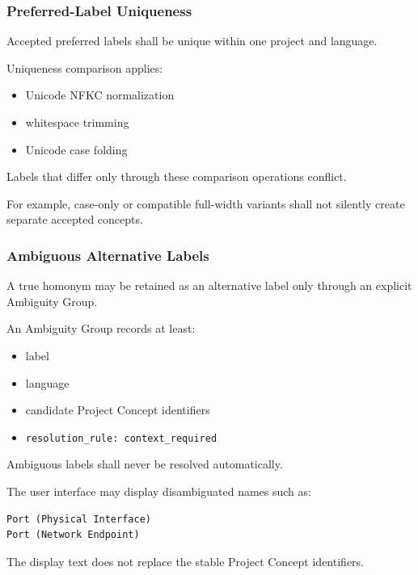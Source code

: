 \hypertarget{preferred-label-uniqueness}{%
\subsubsection{Preferred-Label Uniqueness}\label{preferred-label-uniqueness}}

Accepted preferred labels shall be unique within one project and language.

Uniqueness comparison applies:

\begin{itemize}
\tightlist
\item
  Unicode NFKC normalization
\item
  whitespace trimming
\item
  Unicode case folding
\end{itemize}

Labels that differ only through these comparison operations conflict.

For example, case-only or compatible full-width variants shall not silently create separate accepted concepts.

\hypertarget{ambiguous-alternative-labels}{%
\subsubsection{Ambiguous Alternative Labels}\label{ambiguous-alternative-labels}}

A true homonym may be retained as an alternative label only through an explicit Ambiguity Group.

An Ambiguity Group records at least:

\begin{itemize}
\tightlist
\item
  label
\item
  language
\item
  candidate Project Concept identifiers
\item
  \texttt{resolution\_rule:\ context\_required}
\end{itemize}

Ambiguous labels shall never be resolved automatically.

The user interface may display disambiguated names such as:

\begin{verbatim}
Port (Physical Interface)
Port (Network Endpoint)
\end{verbatim}

The display text does not replace the stable Project Concept identifiers.

